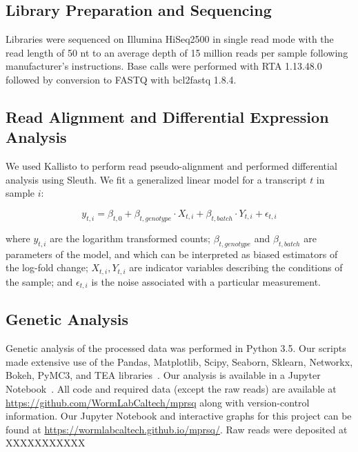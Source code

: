 \documentclass[9pt,twocolumn,twoside]{pnas-new}
\begin{document}
{\subsection*{Library Preparation and Sequencing}
Libraries were sequenced on Illumina HiSeq2500 in single read mode with the read
length of 50 nt to an average depth of 15 million reads per sample following
manufacturer's instructions. Base calls were performed with RTA 1.13.48.0
followed by conversion to FASTQ with bcl2fastq 1.8.4.

\subsection*{Read Alignment and Differential Expression Analysis}
We used Kallisto to perform read pseudo-alignment and performed differential
analysis using Sleuth. We fit a generalized linear model for a transcript $t$ in
sample $i$:

\begin{equation}
  y_{t,i} = \beta_{t, 0} + \beta_{t, genotype}\cdot{}X_{t, i} +
  \beta_{t, batch}\cdot{}Y_{t, i} + \epsilon_{t, i}
\end{equation}

where $y_{t, i}$ are the logarithm transformed counts; $\beta_{t, genotype}$ and
$\beta_{t, batch}$ are parameters of the model, and which can be interpreted as
biased estimators of the log-fold change; $X_{t, i}, Y_{t, i}$ are indicator
variables describing the conditions of the sample; and $\epsilon_{t, i}$ is the
noise associated with a particular measurement.

\subsection*{Genetic Analysis}
Genetic analysis of the processed data was performed in Python 3.5. Our scripts
made extensive use of the Pandas, Matplotlib, Scipy, Seaborn, Sklearn, Networkx,
Bokeh, PyMC3, and TEA libraries~\cite{Team2014,McKinney2011,Oliphant2007,
Pedregosa2012,Salvatier2015,VanDerWalt2011,Hunter2007,Angeles-Albores2016,Waskom}.
Our analysis is available in a Jupyter Notebook~\cite{Perez2007}. All code and
required data (except the raw reads) are available at
\url{https://github.com/WormLabCaltech/mprsq} along with version-control
information. Our Jupyter Notebook and interactive graphs for this project can be
found at \url{https://wormlabcaltech.github.io/mprsq/}. Raw reads were deposited
at XXXXXXXXXXX
}

\showmatmethods{}%
\end{document}
